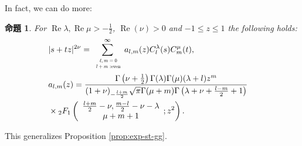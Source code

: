 \documentclass[pdf,notes]{beamer}
\newcommand{\tmop}[1]{\ensuremath{\operatorname{#1}}}
\newtheorem{prop}{命題}
\begin{document}
\begin{frame}
	In fact, we can do more:
	\begin{prop}\label{prop:exp-stz-gg}
		  \label{thm:4}For $\tmop{Re} \lambda, \tmop{Re} \mu > - \frac{1}{2}$,
		    $\tmop{Re} (\nu) > 0$ and $-1 \leqslant z \leqslant 1$ the following holds:
		      \begin{eqnarray}
			      & | s + t z |^{2 \nu}  = \sum_{\scalebox{0.6}{
				      $\begin{array}[]{c}
						  \ell,m=0\\l + m\mbox{ :even}
					  \end{array}
				  $}}^{\infty} a_{l, m}
					          (z) C_l^{\lambda} (s) C_m^{\mu} (t), &  \nonumber\\
						      & a_{l, m} (z) = \frac{\Gamma \left( \nu + \frac{1}{2} \right) \Gamma
						      (\lambda) \Gamma (\mu) (\lambda + l) z^m }{(1 + \nu)_{- \frac{l + m}{2}} \sqrt{\pi} \Gamma
										      (\mu + m) \Gamma \left( \lambda + \nu + \frac{l - m}{2} + 1 \right)}&\nonumber
										      \\&\times{}_2 F_1 \left( \begin{array}{c}
								        \frac{l + m}{2} - \nu, \frac{m - l}{2} - \nu - \lambda\\
									      \mu + m + 1
									          \end{array} ; z^2 \right). & 
										          \nonumber
											    \end{eqnarray}
										    \end{prop}
										    This generalizes Proposition \ref{prop:exp-st-gg}.
\end{frame}
\end{document}
